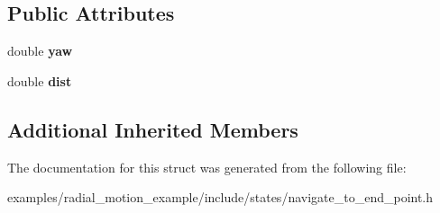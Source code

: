 \subsection*{Public Attributes}
\begin{DoxyCompactItemize}
\item 
\mbox{\label{structNavigateToEndPoint_1_1Navigate_aeb3886a6421a3784e7ac74e097da64cf}} 
double {\bfseries yaw}
\item 
\mbox{\label{structNavigateToEndPoint_1_1Navigate_a12b46aba729c97adb1b1bfec87ec166a}} 
double {\bfseries dist}
\end{DoxyCompactItemize}
\subsection*{Additional Inherited Members}


The documentation for this struct was generated from the following file\+:\begin{DoxyCompactItemize}
\item 
examples/radial\+\_\+motion\+\_\+example/include/states/navigate\+\_\+to\+\_\+end\+\_\+point.\+h\end{DoxyCompactItemize}
